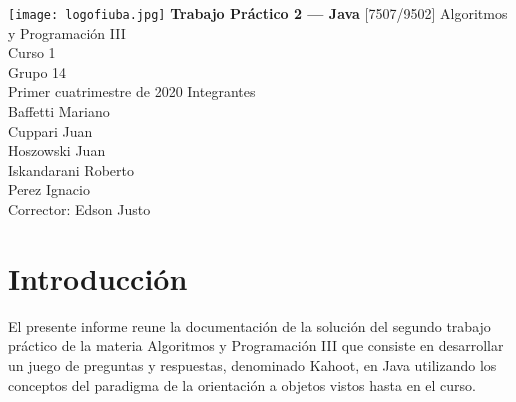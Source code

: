\documentclass[titlepage,a4paper]{article}
\begin{document}
\begin{titlepage} %
	\hfill\texttt{[image: logofiuba.jpg]}
    \centering
    \vfill
    \Huge \textbf{Trabajo Práctico 2 — Java}
    \vskip2cm
    \Large [7507/9502] Algoritmos y Programación III\\
    Curso 1 \\ %
    Grupo 14 \\
    Primer cuatrimestre de 2020 
    \vfill
    Integrantes\\[1\baselineskip]
    
    Baffetti Mariano\\
    Cuppari Juan\\
    Hoszowski Juan\\
    Iskandarani Roberto\\
    Perez Ignacio\\
    \vfill
    Corrector: Edson Justo
    \vfill
\end{titlepage}

\tableofcontents %
\newpage

\section{Introducción}\label{sec:intro}
El presente informe reune la documentación de la solución del segundo trabajo práctico de la materia Algoritmos y Programación III que consiste en desarrollar un juego de preguntas y respuestas, denominado Kahoot, en Java utilizando los conceptos del paradigma de la orientación a objetos vistos hasta en el curso.
\end{document}
